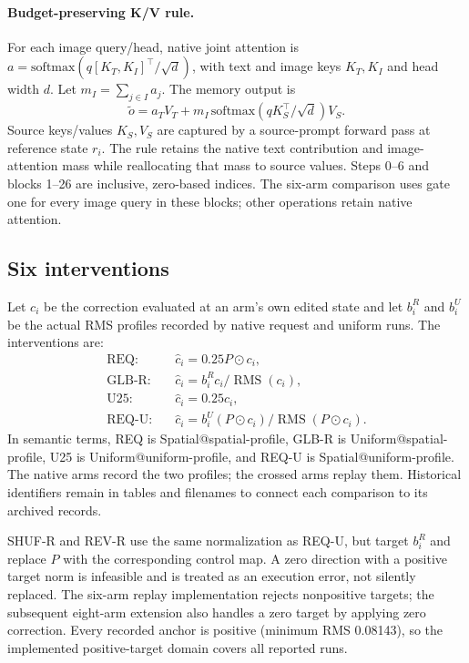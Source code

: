 \documentclass[10pt,doubleanonymous]{ieeeconf}
\newcommand{\RMS}{\operatorname{RMS}}
\begin{document}
\paragraph{Budget-preserving K/V rule.}
For each image query/head, native joint attention is $a=\mathrm{softmax}(q[K_T,K_I]^\top/\sqrt d)$, with text and image keys $K_T,K_I$ and head width $d$. Let $m_I=\sum_{j\in I}a_j$. The memory output is
\begin{equation}
\widetilde o=a_TV_T+m_I\,\mathrm{softmax}(qK_S^\top/\sqrt d)V_S.
\end{equation}
Source keys/values $K_S,V_S$ are captured by a source-prompt forward pass at reference state $r_i$. The rule retains the native text contribution and image-attention mass while reallocating that mass to source values. Steps 0--6 and blocks 1--26 are inclusive, zero-based indices. The six-arm comparison uses gate one for every image query in these blocks; other operations retain native attention.

\subsection{Six interventions}
Let $c_i$ be the correction evaluated at an arm's own edited state and let $b_i^R$ and $b_i^U$ be the actual RMS profiles recorded by native request and uniform runs. The interventions are:
\begin{align}
\mathrm{REQ}:&\quad \widehat c_i=0.25P\odot c_i,\\
\text{GLB-R}:&\quad \widehat c_i=b_i^R c_i/\RMS(c_i),\\
\mathrm{U25}:&\quad \widehat c_i=0.25c_i,\\
\text{REQ-U}:&\quad \widehat c_i=b_i^U(P\odot c_i)/\RMS(P\odot c_i).
\end{align}
In semantic terms, REQ is Spatial@spatial-profile, GLB-R is Uniform@spatial-profile, U25 is Uniform@uniform-profile, and REQ-U is Spatial@uniform-profile. The native arms record the two profiles; the crossed arms replay them. Historical identifiers remain in tables and filenames to connect each comparison to its archived records.

SHUF-R and REV-R use the same normalization as REQ-U, but target $b_i^R$ and replace $P$ with the corresponding control map. A zero direction with a positive target norm is infeasible and is treated as an execution error, not silently replaced. The six-arm replay implementation rejects nonpositive targets; the subsequent eight-arm extension also handles a zero target by applying zero correction. Every recorded anchor is positive (minimum RMS 0.08143), so the implemented positive-target domain covers all reported runs.
\end{document}
